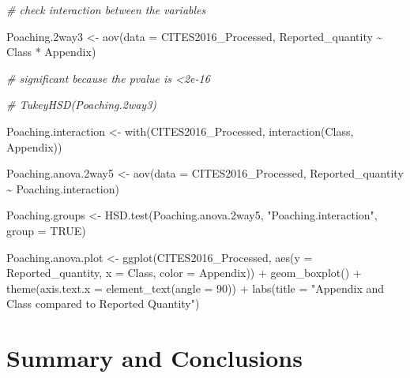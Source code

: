 \documentclass[
  12pt,
]{article}
\newenvironment{Shaded}{\begin{snugshade}}{\end{snugshade}}
\newcommand{\AttributeTok}[1]{\textcolor[rgb]{0.77,0.63,0.00}{#1}}
\newcommand{\CommentTok}[1]{\textcolor[rgb]{0.56,0.35,0.01}{\textit{#1}}}
\newcommand{\ConstantTok}[1]{\textcolor[rgb]{0.00,0.00,0.00}{#1}}
\newcommand{\DecValTok}[1]{\textcolor[rgb]{0.00,0.00,0.81}{#1}}
\newcommand{\FloatTok}[1]{\textcolor[rgb]{0.00,0.00,0.81}{#1}}
\newcommand{\FunctionTok}[1]{\textcolor[rgb]{0.00,0.00,0.00}{#1}}
\newcommand{\NormalTok}[1]{#1}
\newcommand{\OtherTok}[1]{\textcolor[rgb]{0.56,0.35,0.01}{#1}}
\newcommand{\SpecialCharTok}[1]{\textcolor[rgb]{0.00,0.00,0.00}{#1}}
\newcommand{\StringTok}[1]{\textcolor[rgb]{0.31,0.60,0.02}{#1}}
\begin{document}
\begin{Shaded}
\begin{Highlighting}[]
\CommentTok{\# check interaction between the variables}

\NormalTok{Poaching}\FloatTok{.2}\NormalTok{way3 }\OtherTok{\textless{}{-}} \FunctionTok{aov}\NormalTok{(}\AttributeTok{data =}\NormalTok{ CITES2016\_Processed, Reported\_quantity }\SpecialCharTok{\textasciitilde{}}\NormalTok{ Class }\SpecialCharTok{*}\NormalTok{ Appendix)}

\CommentTok{\# significant because the pvalue is \textless{}2e{-}16}

\CommentTok{\# TukeyHSD(Poaching.2way3)}

\NormalTok{Poaching.interaction }\OtherTok{\textless{}{-}} \FunctionTok{with}\NormalTok{(CITES2016\_Processed, }\FunctionTok{interaction}\NormalTok{(Class, Appendix))}

\NormalTok{Poaching.anova}\FloatTok{.2}\NormalTok{way5 }\OtherTok{\textless{}{-}} \FunctionTok{aov}\NormalTok{(}\AttributeTok{data =}\NormalTok{ CITES2016\_Processed, Reported\_quantity }\SpecialCharTok{\textasciitilde{}}\NormalTok{ Poaching.interaction)}

\NormalTok{Poaching.groups }\OtherTok{\textless{}{-}} \FunctionTok{HSD.test}\NormalTok{(Poaching.anova}\FloatTok{.2}\NormalTok{way5, }\StringTok{"Poaching.interaction"}\NormalTok{, }\AttributeTok{group =} \ConstantTok{TRUE}\NormalTok{)}

\NormalTok{Poaching.anova.plot }\OtherTok{\textless{}{-}} \FunctionTok{ggplot}\NormalTok{(CITES2016\_Processed, }\FunctionTok{aes}\NormalTok{(}\AttributeTok{y =}\NormalTok{ Reported\_quantity, }\AttributeTok{x =}\NormalTok{ Class,}
    \AttributeTok{color =}\NormalTok{ Appendix)) }\SpecialCharTok{+} \FunctionTok{geom\_boxplot}\NormalTok{() }\SpecialCharTok{+} \FunctionTok{theme}\NormalTok{(}\AttributeTok{axis.text.x =} \FunctionTok{element\_text}\NormalTok{(}\AttributeTok{angle =} \DecValTok{90}\NormalTok{)) }\SpecialCharTok{+}
    \FunctionTok{labs}\NormalTok{(}\AttributeTok{title =} \StringTok{"Appendix and Class compared to Reported Quantity"}\NormalTok{)}
\end{Highlighting}
\end{Shaded}

\newpage

\hypertarget{summary-and-conclusions}{%
\section{Summary and Conclusions}\label{summary-and-conclusions}}
\end{document}
